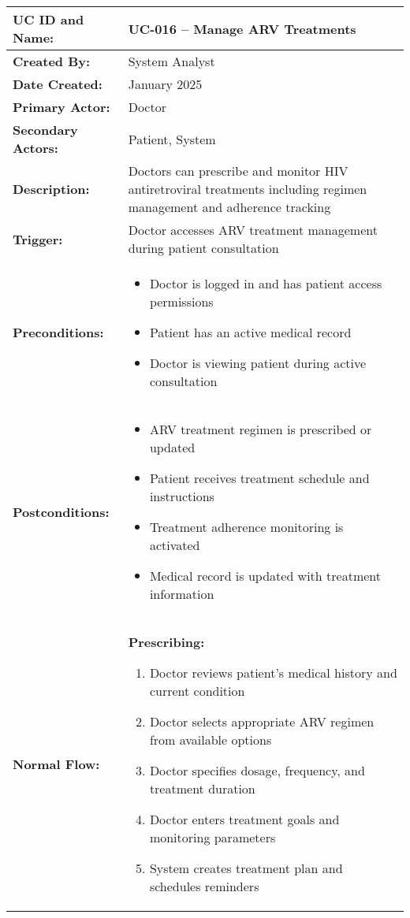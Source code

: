 \documentclass[12pt,a4paper]{article}
\begin{document}
\renewcommand{\arraystretch}{1.5}
\begin{longtable}{|p{4.5cm}|p{10.5cm}|}
\hline
\textbf{UC ID and Name:} & UC-016 – Manage ARV Treatments \\
\hline
\textbf{Created By:} & System Analyst \\
\hline
\textbf{Date Created:} & January 2025 \\
\hline
\textbf{Primary Actor:} & Doctor \\
\hline
\textbf{Secondary Actors:} & Patient, System \\
\hline
\textbf{Description:} & Doctors can prescribe and monitor HIV antiretroviral treatments including regimen management and adherence tracking \\
\hline
\textbf{Trigger:} & Doctor accesses ARV treatment management during patient consultation \\
\hline
\textbf{Preconditions:} &
\begin{itemize}
  \item Doctor is logged in and has patient access permissions
  \item Patient has an active medical record
  \item Doctor is viewing patient during active consultation
\end{itemize} \\
\hline
\textbf{Postconditions:} &
\begin{itemize}
  \item ARV treatment regimen is prescribed or updated
  \item Patient receives treatment schedule and instructions
  \item Treatment adherence monitoring is activated
  \item Medical record is updated with treatment information
\end{itemize} \\
\hline
\textbf{Normal Flow:} &
\textbf{Prescribing:}
\begin{enumerate}
  \item Doctor reviews patient's medical history and current condition
  \item Doctor selects appropriate ARV regimen from available options
  \item Doctor specifies dosage, frequency, and treatment duration
  \item Doctor enters treatment goals and monitoring parameters
  \item System creates treatment plan and schedules reminders

\end{enumerate}
\end{longtable}
\end{document}
